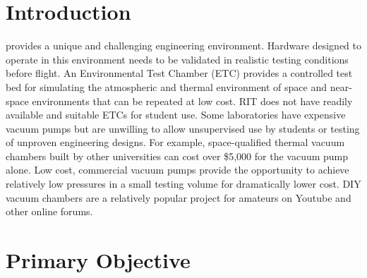 \documentclass[conference]{IEEEtran} %
\begin{document}

\section{Introduction}
\label{sec:introduction}

 provides a unique and challenging engineering environment.
Hardware designed to operate in this environment needs to be validated in realistic testing conditions before flight.
An Environmental Test Chamber (ETC) provides a controlled test bed for simulating the atmospheric and thermal environment of space and near-space environments that can be repeated at low cost.
RIT does not have readily available and suitable ETCs for student use.
Some laboratories have expensive vacuum pumps but are unwilling to allow unsupervised use by students or testing of unproven engineering designs.
For example, space-qualified thermal vacuum chambers built by other universities can cost over \$5,000 for the vacuum pump alone.\cite{teb13}
Low cost, commercial vacuum pumps provide the opportunity to achieve relatively low pressures in a small testing volume for dramatically lower cost.
DIY vacuum chambers are a relatively popular project for amateurs on Youtube and other online forums.\cite{korYoutube}

\section{Primary Objective}
\label{sec:primary-obj}
\end{document}
